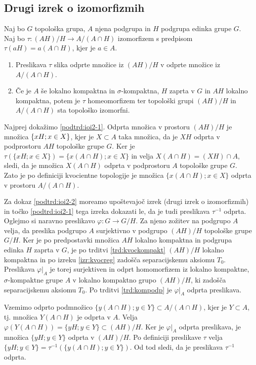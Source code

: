 \documentclass[mat1]{fmfdelo}
\begin{document}
\subsection{Drugi izrek o izomorfizmih}
\begin{izrek}\label{izr:drugitopizrek}
Naj bo $G$ topološka grupa, $A$ njena podgrupa in $H$ podgrupa edinka grupe $G$. Naj bo $\tau\colon (AH)/H \to A/(A \cap H)$ izomorfizem s predpisom $\tau (aH) = a(A \cap H)$, kjer je $a \in A$.
\begin{enumerate}
\item Preslikava $\tau$ slika odprte množice iz $(AH)/H$ v odprte množice iz $A/(A \cap H)$. \label{podtrd:ioi2-1}
\item Če je $A$ še lokalno kompaktna in $\sigma$-kompaktna, $H$ zaprta v $G$ in $AH$ lokalno kompaktna, potem je $\tau$ homeomorfizem ter topološki grupi $(AH)/H$ in $A/(A \cap H)$ sta topološko izomorfni. \label{podtrd:ioi2-2}
\end{enumerate}
\end{izrek}

\begin{dokaz}
Najprej dokažimo \ref{podtrd:ioi2-1}.
Odprta množica v prostoru $(AH)/H$ je množica $\lbrace xH ; \break x\in X \rbrace$, kjer je $X \subset A$ taka množica, da je $XH$ odprta v podprostoru $AH$ topološke grupe $G$. Ker je $\tau(\lbrace xH ; x \in X \rbrace) = \lbrace x(A \cap H) ; x \in X \rbrace$ in velja $X(A \cap H) = (XH)\cap A$, sledi, da je množica $X(A \cap H)$ odprta v podprostoru $A$ topološke grupe $G$. Zato je po definiciji kvocientne topologije je množica $\lbrace x(A\cap H) ; x \in X \rbrace$ odprta v prostoru $A/(A \cap H)$.

Za dokaz \ref{podtrd:ioi2-2} moreamo upoštevajoč izrek (drugi izrek o izomorfizmih) in točko \ref{podtrd:ioi2-1} tega izreka dokazati le, da je tudi preslikava $\tau^{-1}$ odprta.
Oglejmo si naravno preslikavo $\varphi\colon G \to G/H$. Za njeno zožitev na podgrupo $A$ velja, da preslika podgrupo $A$ surjektivno v podgrupo $(AH)/H$ topološke grupe $G/H$. Ker je po predpostavki množica $AH$ lokalno kompaktna in podgrupa edinka $H$ zaprta v $G$, je po trditvi \ref{trd:kvockompakt} $(AH)/H$ lokalno kompaktna in po izreku \ref{izr:kvocreg} zadošča separacijskemu aksiomu $T_0$. Preslikava $\varphi|_A$ je torej surjektiven in odprt homomorfizem iz lokalno kompaktne, $\sigma$-kompaktne grupe $A$ v lokalno kompaktno grupo $(AH)/H$, ki zadošča separacijskemu aksiomu $T_0$. Po trditvi \ref{trd:kompodp} je $\varphi|_A$ odprta preslikava.

Vzemimo odprto podmnožico $\lbrace y(A \cap H) ; y \in Y \rbrace \subset A/(A \cap H)$, kjer je $Y \subset A$, tj. množica $Y(A \cap H)$ je odprta v $A$. Velja $\varphi(Y(A \cap H)) = \lbrace yH ; y \in Y \rbrace \subset (AH)/H$. Ker je $\varphi|_A$ odprta preslikava, je množica $\lbrace yH ; y \in Y \rbrace$ odprta v $(AH)/H$. Po definiciji preslikave $\tau$ velja $\lbrace yH ; y \in Y \rbrace = \tau^{-1}(\lbrace y(A \cap H) ; y \in Y \rbrace)$. Od tod sledi, da je preslikava $\tau^{-1}$ odprta.
\end{dokaz}
\end{document}

